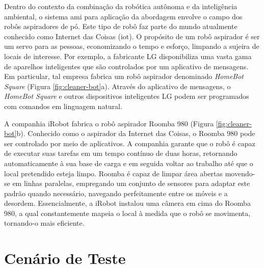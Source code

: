 Dentro do contexto da combinação da robótica autônoma e da inteligência ambiental, o sistema \acrshort{ami} para aplicação da abordagem envolve o campo dos robôs aspiradores de pó. Este tipo de robô faz parte do mundo atualmente conhecido como Internet das Coisas (\acrshort{iot}). O propósito de um robô aspirador é ser um servo para as pessoas, economizando o tempo e esforço, limpando a sujeira de locais de interesse. Por exemplo, a fabricante LG disponibiliza uma vasta gama de aparelhos inteligentes que são controlados por um aplicativo de mensagens. Em particular, tal empresa fabrica um robô aspirador denominado \textit{HomeBot Square} (Figura \ref{fig:cleaner-bot}a). Através do aplicativo de mensagens, o \textit{HomeBot Square} e outros dispositivos inteligentes LG podem ser programados com comandos em linguagem natural.

\begin{figure}[h!]
    \centering
\end{figure}

A companhia iRobot fabrica o robô aspirador Roomba 980 (Figura \ref{fig:cleaner-bot}b). Conhecido como o aspirador da Internet das Coisas, o Roomba 980 pode ser controlado por meio de aplicativos. A companhia garante que o robô é capaz de executar suas tarefas em um tempo contínuo de duas horas, retornando automaticamente à sua base de carga e em seguida voltar ao trabalho até que o local pretendido esteja limpo. Roomba é capaz de limpar área abertas movendo-se em linhas paralelas, empregando um conjunto de sensores para adaptar este padrão quando necessário, navegando perfeitamente entre os móveis e a desordem. Essencialmente, a iRobot instalou uma câmera em cima do Roomba 980, a qual constantemente mapeia o local à medida que o robô se movimenta, tornando-o mais eficiente. 

\section{Cenário de Teste}
\label{sec:cenario-teste}

